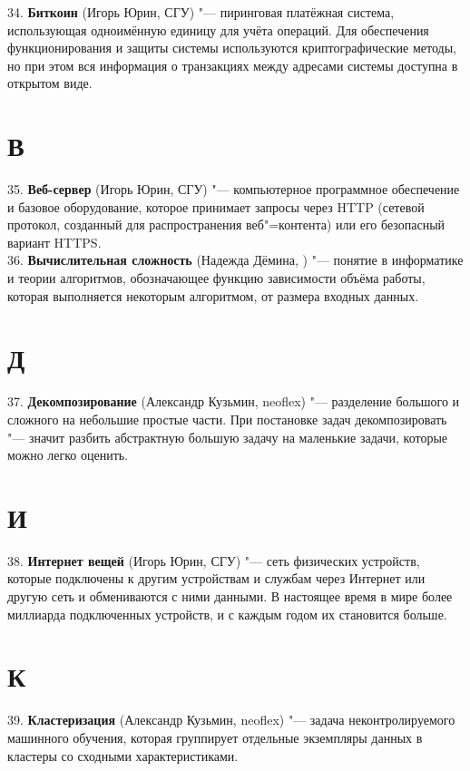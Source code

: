 \documentclass[14 pt]{extarticle}
\begin{document}
    34. \textbf{Биткоин} (Игорь Юрин, СГУ) "--- пиринговая платёжная система, использующая одноимённую единицу для учёта операций. Для обеспечения функционирования и защиты системы используются криптографические методы, но при этом вся информация о транзакциях между адресами системы доступна в открытом виде. \\
    
\section*{В}
    35. \textbf{Веб-сервер} (Игорь Юрин, СГУ) "--- компьютерное программное обеспечение и базовое оборудование, которое принимает запросы через HTTP (сетевой протокол, созданный для распространения веб"=контента) или его безопасный вариант HTTPS. \\
    
    36. \textbf{Вычислительная сложность} (Надежда Дёмина, ) "--- понятие в информатике и теории алгоритмов, обозначающее функцию зависимости объёма работы, которая выполняется некоторым алгоритмом, от размера входных данных. \\
    
\section*{Д}
    37. \textbf{Декомпозирование} (Александр Кузьмин, neoflex) "--- разделение большого и сложного на небольшие простые части. При постановке задач декомпозировать "--- значит разбить абстрактную большую задачу на маленькие задачи, которые можно легко оценить. \\
    
\section*{И}
    38. \textbf{Интернет вещей} (Игорь Юрин, СГУ) "--- сеть физических устройств, которые подключены к другим устройствам и службам через Интернет или другую сеть и обмениваются с ними данными. В настоящее время в мире более миллиарда подключенных устройств, и с каждым годом их становится больше. \\
    
\section*{К}
    39. \textbf{Кластеризация} (Александр Кузьмин, neoflex) "--- задача неконтролируемого машинного обучения, которая группирует отдельные экземпляры данных в кластеры со сходными характеристиками. \\
    
\end{document}
